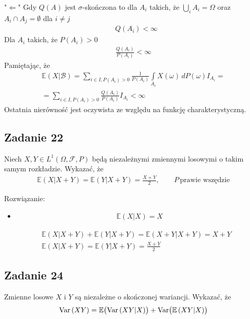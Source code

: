 "$ \Leftarrow $" Gdy $ Q(A) $ jest $ \sigma $-skończona to dla $ A_i $ takich, że $ \bigcup_i A_i=\Omega $ oraz $ A_i\cap A_j=\emptyset $ dla $ i\neq j $
\begin{align*}
&Q(A_i)<\infty
\end{align*}
Dla $ A_i $ takich, że $ P(A_i)>0 $
\begin{gather*}
\frac{Q(A_i)}{P(A_i)}<\infty 
\end{gather*}
Pamiętając, że
\begin{gather*}
\mathbb E \left(X|\mathcal B\right)=
\sum_{i\in I,P\left(A_i\right)>0}\frac{1}{P\left(A_i\right)}\int\limits_{A_i}X(\omega)\,dP(\omega)I_{A_i}
=\\=
\sum_{i\in I,P\left(A_i\right)>0}\frac{Q(A_i)}{P\left(A_i\right)}I_{A_i}<\infty 
\end{gather*}
Ostatnia nierówność jest oczywista ze względu na funkcję charakterystyczną.


\subsection*{Zadanie 22}
Niech $ X,Y\in L^1\left(\Omega,\mathcal F, P\right) $ będą niezależnymi zmiennymi losowymi o takim samym rozkładzie. Wykazać, że
\begin{gather*}
\mathbb E \left(X|X+Y\right)=\mathbb E \left(Y|X+Y\right)=\frac{X+Y}{2},\qquad P\,\text{prawie wszędzie}
\end{gather*}

Rozwiązanie:
\begin{itemize}
\item 
\begin{gather*}
\mathbb E \left(X|X\right)
=
X
\end{gather*}
\end{itemize}
\begin{align*}
&\mathbb E \left(X|X+Y\right)
+
\mathbb E \left(Y|X+Y\right)
=
\mathbb E \left(X+Y|X+Y\right)
=
X+Y\\
&\mathbb E \left(X|X+Y\right)
=
\mathbb E \left(Y|X+Y\right)=\frac{X+Y}{2}
\end{align*}


\subsection*{Zadanie 24}
Zmienne losowe $ X $ i $ Y $ są niezależne o skończonej wariancji. Wykazać, że
\begin{gather*}
\text{Var}\left(XY\right) = \mathbb E \bigl(\text{Var}\left(XY|X\right)\bigr)+\text{Var}\bigl(\mathbb E \left(XY|X\right)\bigr)
\end{gather*}

